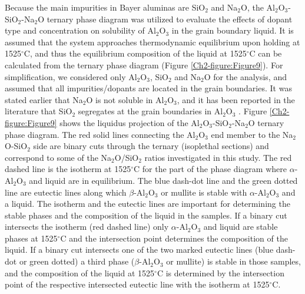 Because the main impurities in Bayer aluminas are SiO$_{2}$ and Na$_{2}$O, the Al$_{2}$O$_{3}$-SiO$_{2}$-Na$_{2}$O ternary phase diagram \cite{Lambotte2013} was utilized to evaluate the effects of dopant type and concentration on solubility of Al$_{2}$O$_{3}$ in the grain boundary liquid. It is assumed that the system approaches thermodynamic equilibrium upon holding at 1525$^{\circ}$C, and thus the equilibrium composition of the liquid at 1525$^{\circ}$C can be calculated from the ternary phase diagram (Figure \ref{Ch2-figure:Figure9}). For simplification, we considered only Al$_{2}$O$_{3}$, SiO$_{2}$ and Na$_{2}$O for the analysis, and assumed that all impurities/dopants are located in the grain boundaries. It was stated earlier that Na$_{2}$O is not soluble in Al$_{2}$O$_{3}$, and it has been reported in the literature that SiO$_{2}$ segregates at the grain boundaries in Al$_{2}$O$_{3}$ \cite{Park2000}. Figure \ref{Ch2-figure:Figure9} shows the liquidus projection of the Al$_{2}$O$_{3}$-SiO$_{2}$-Na$_{2}$O ternary phase diagram. The red solid lines connecting the Al$_{2}$O$_{3}$ end member to the Na$_{2}$O-SiO$_{2}$ side are binary cuts through the ternary (isoplethal sections) and correspond to some of the Na$_{2}$O/SiO$_{2}$ ratios investigated in this study. The red dashed line is the isotherm at 1525$^{\circ}$C for the part of the phase diagram where $\alpha$-Al$_{2}$O$_{3}$ and liquid are in equilibrium. The blue dash-dot line and the green dotted line are eutectic lines along which $\beta$-Al$_{2}$O$_{3}$ or mullite is stable with $\alpha$-Al$_{2}$O$_{3}$ and a liquid. The isotherm and the eutectic lines are important for determining the stable phases and the composition of the liquid in the samples. If a binary cut intersects the isotherm (red dashed line) only $\alpha$-Al$_{2}$O$_{3}$ and liquid are stable phases at 1525$^{\circ}$C and the intersection point determines the composition of the liquid. If a binary cut intersects one of the two marked eutectic lines (blue dash-dot or green dotted) a third phase ($\beta$-Al$_{2}$O$_{3}$ or mullite) is stable in those samples, and the composition of the liquid at 1525$^{\circ}$C is determined by the intersection point of the respective intersected eutectic line with the isotherm at 1525$^{\circ}$C.

